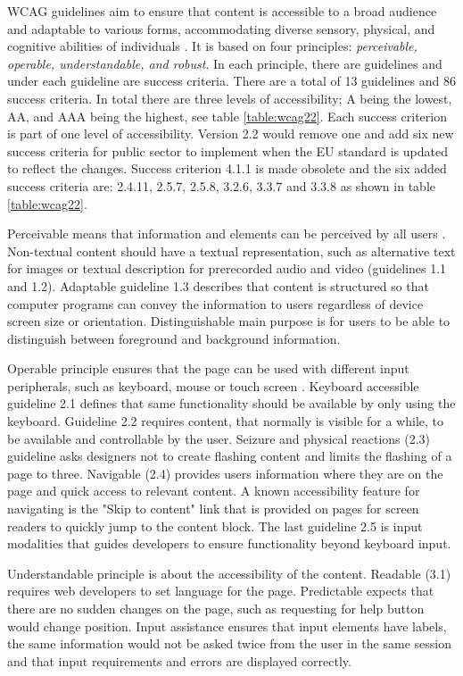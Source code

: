 WCAG guidelines aim to ensure that content is accessible to a broad audience and adaptable to various forms, accommodating diverse sensory, physical, and cognitive abilities of individuals \citep{wcag22}. It is based on four principles: \textit{perceivable, operable, understandable, and robust}. In each principle, there are guidelines and under each guideline are success criteria. There are a total of 13 guidelines and 86 success criteria. In total there are three levels of accessibility; A being the lowest, AA, and AAA being the highest, see table \ref{table:wcag22}. Each success criterion is part of one level of accessibility. Version 2.2 would remove one and add six new success criteria for public sector to implement when the EU standard is updated to reflect the changes. Success criterion 4.1.1 is made obsolete and the six added success criteria are: 2.4.11, 2.5.7, 2.5.8, 3.2.6, 3.3.7 and 3.3.8 as shown in table \ref{table:wcag22}. 



Perceivable means that information and elements can be perceived by all users \citep{wcag22}. Non-textual content should have a textual representation, such as alternative text for images or textual description for prerecorded audio and video (guidelines 1.1 and 1.2). Adaptable guideline 1.3 describes that content is structured so that computer programs can convey the information to users regardless of device screen size or orientation. Distinguishable main purpose is for users to be able to distinguish between foreground and background information.

Operable principle ensures that the page can be used with different input peripherals, such as keyboard, mouse or touch screen \cite{wcag22}. Keyboard accessible guideline 2.1 defines that same functionality should be available by only using the keyboard. Guideline 2.2 requires content, that normally is visible for a while, to be available and controllable by the user. Seizure and physical reactions (2.3) guideline asks designers not to create flashing content and limits the flashing of a page to three. Navigable (2.4) provides users information where they are on the page and quick access to relevant content. A known accessibility feature for navigating is the "Skip to content" link that is provided on pages for screen readers to quickly jump to the content block. The last guideline 2.5 is input modalities that guides developers to ensure functionality beyond keyboard input.

Understandable principle is about the accessibility of the content. Readable (3.1) requires web developers to set language for the page. Predictable expects that there are no sudden changes on the page, such as requesting for help button would change position. Input assistance ensures that input elements have labels, the same information would not be asked twice from the user in the same session and that input requirements and errors are displayed correctly. 


